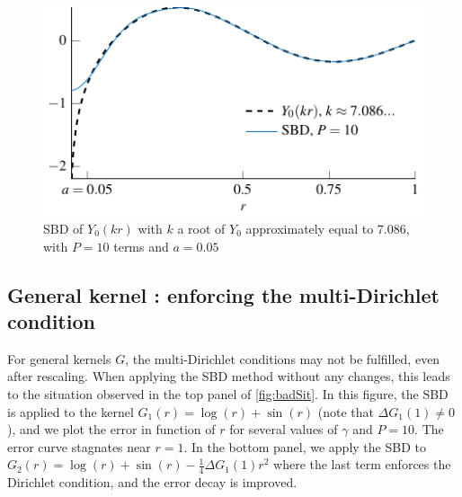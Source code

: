 \documentclass[smallextended]{svjour3}
\begin{document}
\begin{figure}[ht]	      	
	\setlength{\plotwidth}{0.7\textwidth}
	\centering	
	\includegraphics[scale = 1]{Y0vsSBD}
	\caption{SBD of $Y_0(kr)$ with $k$ a root of $Y_0$ approximately equal to $7.086$, with $P=10$ terms and $a=0.05$ }	      
	\label{Y0Example}
\end{figure}				


																										
\subsection{General kernel : enforcing the multi-Dirichlet condition}
\label{begal1}
For general kernels $G$, the multi-Dirichlet conditions may not be fulfilled, even after rescaling. When applying the SBD method without any changes, this leads to the situation observed in the top panel of \autoref{fig:badSit}. In this figure, the SBD is applied to the kernel $G_1(r) = \log(r) + \sin(r)$ (note that $\Delta G_1(1) \neq 0$), and we plot the error in function of $r$ for several values of $\gamma$ and $P = 10$. The error curve stagnates near $r=1$. In the bottom panel, we apply the SBD to $G_2(r) = \log(r) + \sin(r) - \frac{1}{4}\Delta G_1(1)r^2$ where the last term enforces the Dirichlet condition, and the error decay is improved. 
\end{document}
